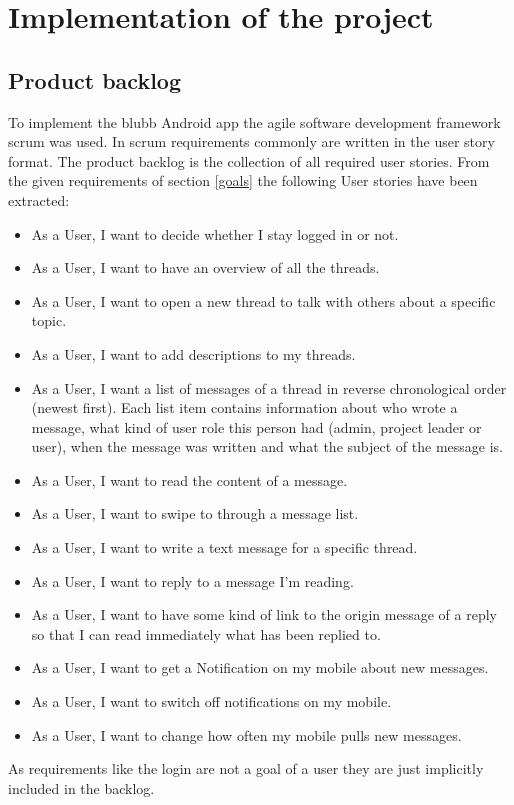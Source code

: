 \documentclass[12pt,a4paper,oneside]{report}
\begin{document}
\chapter{Implementation of the project}
\section{Product backlog}
To implement the blubb Android app the agile software development framework scrum was used. In scrum requirements commonly are written in the user story format. The product backlog is the collection of all required user stories.
From the given requirements of section \ref{goals} the following User stories have been extracted: 
\begin{itemize}
\item As a User, I want to decide whether I stay logged in or not.
\item As a User, I want to have an overview of all the threads.
\item As a User, I want to open a new thread to talk with others about a specific topic.
\item As a User, I want to add descriptions to my threads.
\item As a User, I want a list of messages of a thread in reverse chronological order (newest first). Each list item contains information about who wrote a message, what kind of user role this person had (admin, project leader or user), when the message was written and what the subject of the message is.
\item As a User, I want to read the content of a message.
\item As a User, I want to swipe to through a message list.
\item As a User, I want to write a text message for a specific thread.  
\item As a User, I want to reply to a message I'm reading.  
\item As a User, I want to have some kind of link to the origin message of a reply so that I can read immediately what has been replied to.
\item As a User, I want to get a Notification on my mobile about new messages.
\item As a User, I want to switch off notifications on my mobile.
\item As a User, I want to change how often my mobile pulls new messages.
 
\end{itemize}
As requirements like the login are not a goal of a user they are just implicitly included in the backlog.\\
\end{document}
